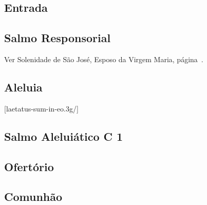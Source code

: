 
\subsection{Entrada}\label{subsection:communia/commune-dedicationis-ecclesiae/introitus}

\subsection{Salmo Responsorial}
\begin{rubrica}
  Ver Solenidade de São José, Esposo da Virgem Maria, página~\pageref{subsection:proprium-sanctorum/sancti-ioseph-sponsi-bmv/psalmus-responsorius}.
\end{rubrica}

\subsection{Aleluia}\label{subsection:communia/commune-dedicationis-ecclesiae/alleluia}
[laetatus-sum-in-eo.3g/]

\AllowPageFlush

\subsection{Salmo Aleluiático \textmd{C 1}}\label{subsection:communia/commune-dedicationis-ecclesiae/psalmus-alleluiaticus}

\AllowPageFlush

\subsection{Ofertório}\label{subsection:communia/commune-dedicationis-ecclesiae/offertorium}

\AllowPageFlush

\subsection{Comunhão}\label{subsection:communia/commune-dedicationis-ecclesiae/communio}
